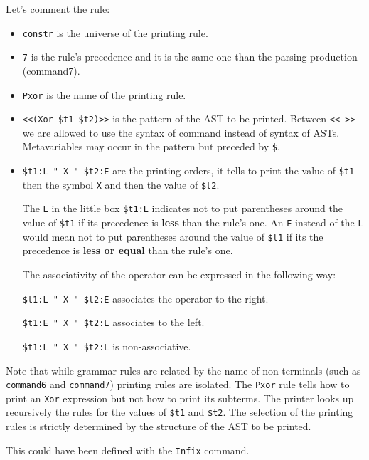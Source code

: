 Let's comment the rule:
\begin{itemize}
\item \verb+constr+ is the universe of the printing rule.

\item \verb+7+ is the rule's precedence and it is the same one than the
  parsing production (command7).

\item \verb+Pxor+ is the name of the printing rule.

\item \verb+<<(Xor $t1 $t2)>>+ is the pattern of the AST to be
  printed. Between \verb+<< >>+ we are allowed to use the syntax of
  command instead of syntax of ASTs. 
  Metavariables may occur in the pattern but preceded by
  \verb+$+.

\item \verb+$t1:L " X " $t2:E+ are the printing
  orders, it tells to print the value of \verb+$t1+ then the symbol
  \verb+X+ and then the value of \verb+$t2+.

  The \verb+L+ in the little box \verb+$t1:L+ indicates not
  to put parentheses around the value of \verb+$t1+ if its precedence
  is {\bf less} than the rule's one. An \verb+E+ instead of the
  \verb+L+ would mean not to put parentheses around the value of
  \verb+$t1+ if its the precedence is {\bf less or equal} than the
  rule's one.

  The associativity of the operator can be expressed in the following
  way:

  \verb&$t1:L " X " $t2:E& associates the operator to the right.

  \verb&$t1:E " X " $t2:L& associates to the left.

  \verb&$t1:L " X " $t2:L& is non-associative.

\end{itemize}

Note that while grammar rules are related by the name of non-terminals
(such as {\tt command6} and {\tt command7}) printing rules are
isolated. The {\tt Pxor} rule tells how to print an {\tt Xor}
expression but not how to print its subterms.  The printer looks up
recursively the rules for the values of \verb+$t1+ and \verb+$t2+. The
selection of the printing rules is strictly determined by the
structure of the AST to be printed.

This could have been defined with the {\tt Infix} command.



